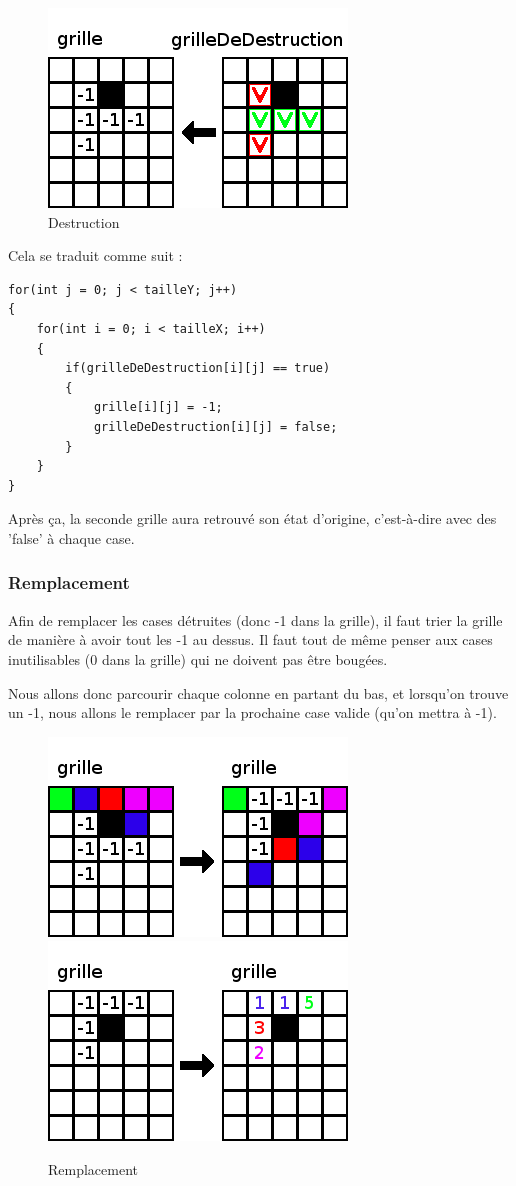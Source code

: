 \begin{figure}[ht]
	\center
	\caption{\label{Destruction} Destruction}
	\includegraphics{imgs/Destruction}
\end{figure}

Cela se traduit comme suit :

\begin{lstlisting}
for(int j = 0; j < tailleY; j++)
{
	for(int i = 0; i < tailleX; i++)
	{
		if(grilleDeDestruction[i][j] == true)
		{
			grille[i][j] = -1;
			grilleDeDestruction[i][j] = false;
		}
	}
}
\end{lstlisting}

Après ça, la seconde grille aura retrouvé son état d'origine, c'est-à-dire avec des 'false' à chaque case.

\subsubsection{Remplacement}

	Afin de remplacer les cases détruites (donc -1 dans la grille), il faut trier la grille de manière à avoir tout les -1 au dessus.
	Il faut tout de même penser aux cases inutilisables (0 dans la grille) qui ne doivent pas être bougées.
	
	Nous allons donc parcourir chaque colonne en partant du bas, et lorsqu'on trouve un -1, nous allons le remplacer par la prochaine case valide (qu'on mettra à -1).
	
\begin{figure}[]
	\center
	\caption{\label{Remplacement} Remplacement}
	\includegraphics{imgs/Remplacement1}
	\includegraphics{imgs/Remplacement2}
\end{figure}
	
